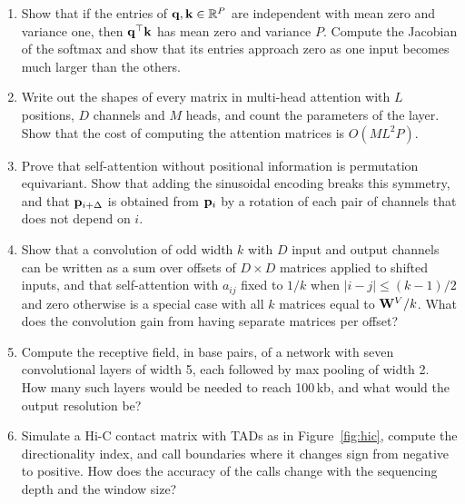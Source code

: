\begin{enumerate}
  \item Show that if the entries of $\mathbf{q},\mathbf{k}\in\mathbb{R}^P$ are independent with mean zero and variance one, then $\mathbf{q}^\top\mathbf{k}$ has mean zero and variance $P$. Compute the Jacobian of the softmax and show that its entries approach zero as one input becomes much larger than the others.
  \item Write out the shapes of every matrix in multi-head attention with $L$ positions, $D$ channels and $M$ heads, and count the parameters of the layer. Show that the cost of computing the attention matrices is $O(ML^2P)$.
  \item Prove that self-attention without positional information is permutation equivariant. Show that adding the sinusoidal encoding breaks this symmetry, and that $\mathbf{p}_{i+\Delta}$ is obtained from $\mathbf{p}_i$ by a rotation of each pair of channels that does not depend on $i$.
  \item Show that a convolution of odd width $k$ with $D$ input and output channels can be written as a sum over offsets of $D\times D$ matrices applied to shifted inputs, and that self-attention with $a_{ij}$ fixed to $1/k$ when $|i-j|\leq(k-1)/2$ and zero otherwise is a special case with all $k$ matrices equal to $\mathbf{W}^V/k$. What does the convolution gain from having separate matrices per offset?
  \item Compute the receptive field, in base pairs, of a network with seven convolutional layers of width 5, each followed by max pooling of width 2. How many such layers would be needed to reach 100\,kb, and what would the output resolution be?
  \item Simulate a Hi-C contact matrix with TADs as in Figure~\ref{fig:hic}, compute the directionality index, and call boundaries where it changes sign from negative to positive. How does the accuracy of the calls change with the sequencing depth and the window size?
\end{enumerate}
